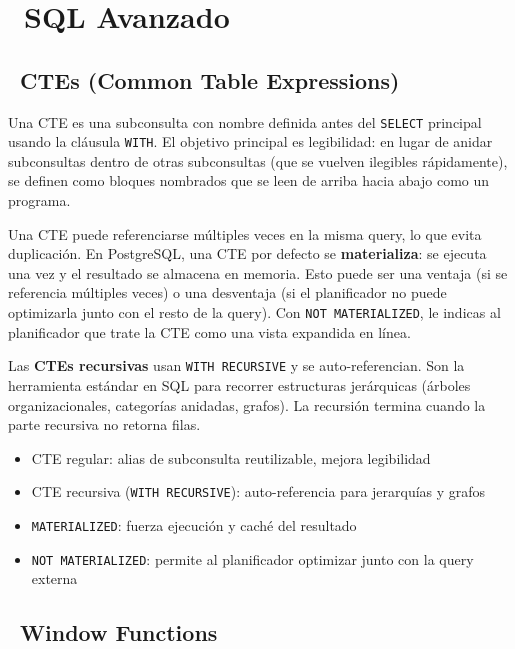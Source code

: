 \chapter[SQL Avanzado]{~SQL Avanzado}

\section[CTEs (Common Table Expressions)]{~CTEs (Common Table Expressions)}

Una CTE es una subconsulta con nombre definida antes del \texttt{SELECT} principal usando la cláusula \texttt{WITH}.
El objetivo principal es legibilidad: en lugar de anidar subconsultas dentro de otras subconsultas (que se vuelven ilegibles rápidamente), se definen como bloques nombrados que se leen de arriba hacia abajo como un programa.

Una CTE puede referenciarse múltiples veces en la misma query, lo que evita duplicación.
En PostgreSQL, una CTE por defecto se \textbf{materializa}: se ejecuta una vez y el resultado se almacena en memoria.
Esto puede ser una ventaja (si se referencia múltiples veces) o una desventaja (si el planificador no puede optimizarla junto con el resto de la query).
Con \texttt{NOT MATERIALIZED}, le indicas al planificador que trate la CTE como una vista expandida en línea.

Las \textbf{CTEs recursivas} usan \texttt{WITH RECURSIVE} y se auto-referencian.
Son la herramienta estándar en SQL para recorrer estructuras jerárquicas (árboles organizacionales, categorías anidadas, grafos).
La recursión termina cuando la parte recursiva no retorna filas.

\begin{itemize}
  \item CTE regular: alias de subconsulta reutilizable, mejora legibilidad
  \item CTE recursiva (\texttt{WITH RECURSIVE}): auto-referencia para jerarquías y grafos
  \item \texttt{MATERIALIZED}: fuerza ejecución y caché del resultado
  \item \texttt{NOT MATERIALIZED}: permite al planificador optimizar junto con la query externa
\end{itemize}

\section[Window Functions]{~Window Functions}

